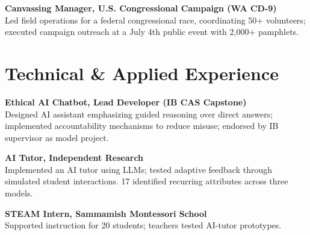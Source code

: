 \documentclass[11pt,a4paper,sans]{moderncv}
\begin{document}
\begin{minipage}[t]{0.70\textwidth}
\textbf{Canvassing Manager, U.S. Congressional Campaign (WA CD-9)} \\
Led field operations for a federal congressional race, coordinating 50+ volunteers; executed campaign outreach at a July 4th public event with 2,000+ pamphlets.

\vspace{1mm}

\section{Technical \& Applied Experience}

\textbf{Ethical AI Chatbot, Lead Developer (IB CAS Capstone)} \\
Designed AI assistant emphasizing guided reasoning over direct answers; implemented accountability mechanisms to reduce misuse; endorsed by IB supervisor as model project.
\vspace{1mm}

\textbf{AI Tutor, Independent Research} \\
Implemented an AI tutor using LLMs; tested adaptive feedback through simulated student interactions. 17 identified recurring attributes across three models.
\vspace{1mm}


\textbf{STEAM Intern, Sammamish Montessori School} \\
Supported instruction for 20 students; teachers tested AI-tutor prototypes.
\vspace{1mm}

\end{minipage}
\end{document}
